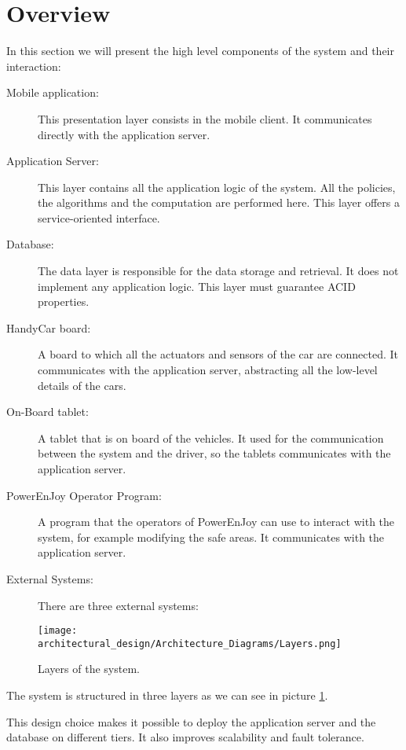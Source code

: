 \section{Overview}
In this section we will present the high level components of the system and their interaction:

\begin{description}
\item[Mobile application:] This presentation layer consists in the mobile client. It communicates directly with the application server.
\item[Application Server:] This layer contains all the application logic of the system. All the policies, the algorithms and the computation are performed here. This layer offers a service-oriented interface.
\item[Database:] The data layer is responsible for the data storage and retrieval. It does not implement any application logic. This layer must guarantee ACID properties. 
\item[HandyCar board:] A board to which all the actuators and sensors of the car are connected.
It communicates with the application server, abstracting all the low-level details of the cars.
\item[On-Board tablet:] A tablet that is on board of the vehicles. It used for the communication between the system and the driver, so the tablets communicates with the application server.
\item[PowerEnJoy Operator Program:] A program that the operators of PowerEnJoy can use to interact with the system, for example modifying the safe areas. It communicates with the application server.
\item[External Systems:] There are three external systems: 
	\begin{itemize}
	\end{itemize}
\end{description}

\begin{figure}
	\centering
	\texttt{[image: architectural\_design/Architecture\_Diagrams/Layers.png]}
	\caption{Layers of the system.}
	\label{fig:layers}
\end{figure}

The system is structured in three layers as we can see in picture \ref{fig:layers}.

This design choice makes it possible to deploy the application server and the database on different tiers. It also improves scalability and fault tolerance.

